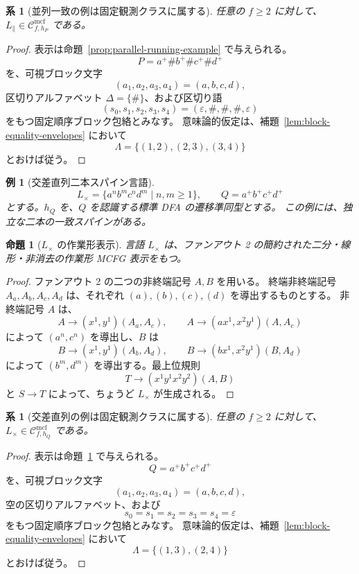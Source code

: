 \documentclass[11pt,a4paper]{ltjsarticle}
\newtheorem{proposition}[theorem]{命題}
\newtheorem{corollary}[theorem]{系}
\newtheorem{example}[theorem]{例}
\theoremstyle{remark}
\newcommand{\Cmcf}[2]{\mathcal{C}^{\mathrm{mcf}}_{#1,#2}}
\newcommand{\eps}{\varepsilon}
\begin{document}
\begin{corollary}[並列一致の例は固定観測クラスに属する]
\label{cor:parallel-in-fixed-observation-class}
任意の \(f\ge2\) に対して、\(L_{\parallel}\in\Cmcf{f}{h_P}\) である。
\end{corollary}

\begin{proof}
表示は命題~\ref{prop:parallel-running-example} で与えられる。
\[
  P=a^+\#b^+\#c^+\#d^+
\]
を、可視ブロック文字
\[
  (a_1,a_2,a_3,a_4)=(a,b,c,d),
\]
区切りアルファベット \(\Delta=\{\#\}\)、および区切り語
\[
  (s_0,s_1,s_2,s_3,s_4)=(\eps,\#,\#,\#,\eps)
\]
をもつ固定順序ブロック包絡とみなす。
意味論的仮定は、補題~\ref{lem:block-equality-envelopes} において
\[
  \Lambda=\{(1,2),(2,3),(3,4)\}
\]
とおけば従う。
\end{proof}

\begin{example}[交差直列二本スパイン言語]
\label{ex:cross-serial-language}
\[
  L_{\times}=\{a^n b^m c^n d^m\mid n,m\ge1\},
  \qquad Q=a^+b^+c^+d^+
\]
とする。\(h_Q\) を、\(Q\) を認識する標準 DFA の遷移準同型とする。
この例には、独立な二本の一致スパインがある。
\end{example}

\begin{proposition}[\(L_{\times}\) の作業形表示]
\label{prop:cross-serial-running-example}
言語 \(L_{\times}\) は、ファンアウト 2 の簡約された二分・線形・非消去の作業形 MCFG 表示をもつ。
\end{proposition}

\begin{proof}
ファンアウト 2 の二つの非終端記号 \(A,B\) を用いる。
終端非終端記号 \(A_a,A_b,A_c,A_d\) は、それぞれ \((a),(b),(c),(d)\) を導出するものとする。
非終端記号 \(A\) は、
\[
  A\to(x^1,y^1)(A_a,A_c),
  \qquad
  A\to(a x^1,x^2 y^1)(A,A_c)
\]
によって \((a^n,c^n)\) を導出し、\(B\) は
\[
  B\to(x^1,y^1)(A_b,A_d),
  \qquad
  B\to(b x^1,x^2 y^1)(B,A_d)
\]
によって \((b^m,d^m)\) を導出する。最上位規則
\[
  T\to(x^1y^1x^2y^2)(A,B)
\]
と \(S\to T\) によって、ちょうど \(L_{\times}\) が生成される。
\end{proof}

\begin{corollary}[交差直列の例は固定観測クラスに属する]
\label{cor:cross-serial-in-fixed-observation-class}
任意の \(f\ge2\) に対して、\(L_{\times}\in\Cmcf{f}{h_Q}\) である。
\end{corollary}

\begin{proof}
表示は命題~\ref{prop:cross-serial-running-example} で与えられる。
\[
  Q=a^+b^+c^+d^+
\]
を、可視ブロック文字
\[
  (a_1,a_2,a_3,a_4)=(a,b,c,d),
\]
空の区切りアルファベット、および
\[
  s_0=s_1=s_2=s_3=s_4=\eps
\]
をもつ固定順序ブロック包絡とみなす。
意味論的仮定は、補題~\ref{lem:block-equality-envelopes} において
\[
  \Lambda=\{(1,3),(2,4)\}
\]
とおけば従う。
\end{proof}
\end{document}
